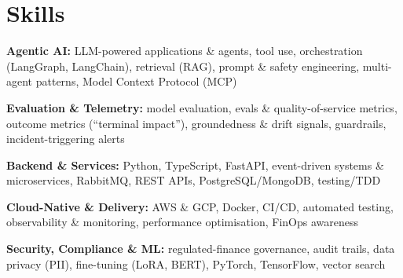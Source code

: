 \documentclass[10pt,a4paper]{article}
\begin{document}
\section{Skills}
\begin{tight}
  \item[\textcolor{accent}{\small$\bullet$}] \textbf{Agentic AI:} LLM-powered applications \& agents, tool use, orchestration (LangGraph, LangChain), retrieval (RAG), prompt \& safety engineering, multi-agent patterns, Model Context Protocol (MCP)
  \item[\textcolor{accent}{\small$\bullet$}] \textbf{Evaluation \& Telemetry:} model evaluation, evals \& quality-of-service metrics, outcome metrics (``terminal impact''), groundedness \& drift signals, guardrails, incident-triggering alerts
  \item[\textcolor{accent}{\small$\bullet$}] \textbf{Backend \& Services:} Python, TypeScript, FastAPI, event-driven systems \& microservices, RabbitMQ, REST APIs, PostgreSQL/MongoDB, testing/TDD
  \item[\textcolor{accent}{\small$\bullet$}] \textbf{Cloud-Native \& Delivery:} AWS \& GCP, Docker, CI/CD, automated testing, observability \& monitoring, performance optimisation, FinOps awareness
  \item[\textcolor{accent}{\small$\bullet$}] \textbf{Security, Compliance \& ML:} regulated-finance governance, audit trails, data privacy (PII), fine-tuning (LoRA, BERT), PyTorch, TensorFlow, vector search
\end{tight}

\end{document}
